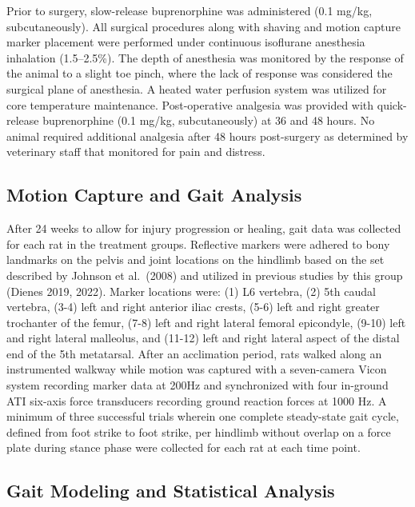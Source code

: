 \documentclass[
]{agujournal2019}
\begin{document}
Prior to surgery, slow-release buprenorphine was administered (0.1
mg/kg, subcutaneously). All surgical procedures along with shaving and
motion capture marker placement were performed under continuous
isoflurane anesthesia inhalation (1.5--2.5\%). The depth of anesthesia
was monitored by the response of the animal to a slight toe pinch, where
the lack of response was considered the surgical plane of anesthesia. A
heated water perfusion system was utilized for core temperature
maintenance. Post-operative analgesia was provided with quick-release
buprenorphine (0.1 mg/kg, subcutaneously) at 36 and 48 hours. No animal
required additional analgesia after 48 hours post-surgery as determined
by veterinary staff that monitored for pain and distress.

\subsection{Motion Capture and Gait
Analysis}\label{motion-capture-and-gait-analysis}

After 24 weeks to allow for injury progression or healing, gait data was
collected for each rat in the treatment groups. Reflective markers were
adhered to bony landmarks on the pelvis and joint locations on the
hindlimb based on the set described by Johnson et al.~(2008) and
utilized in previous studies by this group (Dienes 2019, 2022). Marker
locations were: (1) L6 vertebra, (2) 5th caudal vertebra, (3-4) left and
right anterior iliac crests, (5-6) left and right greater trochanter of
the femur, (7-8) left and right lateral femoral epicondyle, (9-10) left
and right lateral malleolus, and (11-12) left and right lateral aspect
of the distal end of the 5th metatarsal. After an acclimation period,
rats walked along an instrumented walkway while motion was captured with
a seven-camera Vicon system recording marker data at 200Hz and
synchronized with four in-ground ATI six-axis force transducers
recording ground reaction forces at 1000 Hz. A minimum of three
successful trials wherein one complete steady-state gait cycle, defined
from foot strike to foot strike, per hindlimb without overlap on a force
plate during stance phase were collected for each rat at each time
point.

\subsection{Gait Modeling and Statistical
Analysis}\label{gait-modeling-and-statistical-analysis}
\end{document}
